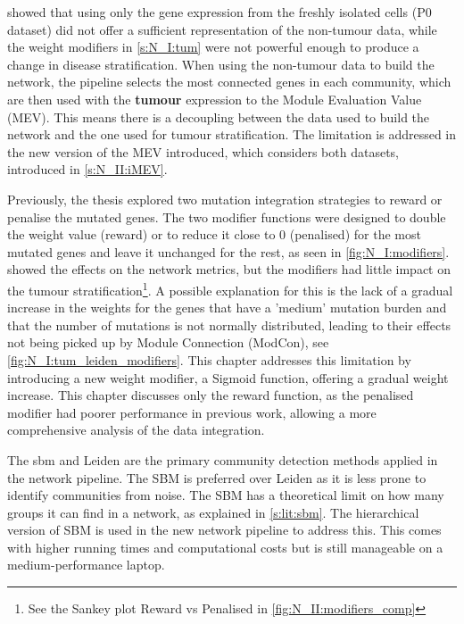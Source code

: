  showed that using only the gene expression from the freshly isolated cells (P0 dataset) did not offer a sufficient representation of the non-tumour data, while the weight modifiers in \cref{s:N_I:tum} were not powerful enough to produce a change in disease stratification. When using the non-tumour data to build the network, the pipeline selects the most connected genes in each community, which are then used with the \textbf{tumour} expression to the Module Evaluation Value (MEV). This means there is a decoupling between the data used to build the network and the one used for tumour stratification. The limitation is addressed in the new version of the MEV introduced, which considers both datasets, introduced in \cref{s:N_II:iMEV}.


Previously, the thesis explored two mutation integration strategies to reward or penalise the mutated genes. The two modifier functions were designed to double the weight value (reward) or to reduce it close to 0 (penalised) for the most mutated genes and leave it unchanged for the rest, as seen in \cref{fig:N_I:modifiers}.  showed the effects on the network metrics, but the modifiers had little impact on the tumour stratification\footnote{See the Sankey plot Reward vs Penalised in \cref{fig:N_II:modifiers_comp}}. A possible explanation for this is the lack of a gradual increase in the weights for the genes that have a 'medium' mutation burden and that the number of mutations is not normally distributed, leading to their effects not being picked up by Module Connection (ModCon), see \cref{fig:N_I:tum_leiden_modifiers}. This chapter addresses this limitation by introducing a new weight modifier, a Sigmoid function, offering a gradual weight increase. This chapter discusses only the reward function, as the penalised modifier had poorer performance in previous work, allowing a more comprehensive analysis of the data integration.


The \acrfull{sbm} and Leiden are the primary community detection methods applied in the network pipeline. The SBM is preferred over Leiden as it is less prone to identify communities from noise. The SBM has a theoretical limit on how many groups it can find in a network, as explained in \cref{s:lit:sbm}. The hierarchical version of SBM is used in the new network pipeline to address this. This comes with higher running times and computational costs but is still manageable on a medium-performance laptop.

